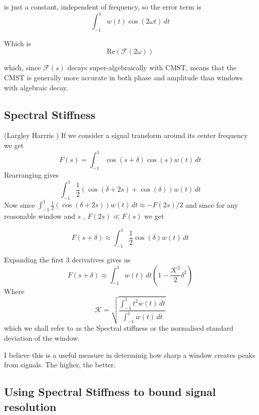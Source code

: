 \documentclass[11pt]{article}
\theoremstyle{breakdef}
\begin{document}
is just a constant, independent of frequency, so the error term is
\begin{equation}
\int_{-1}^{1} w(t) \cos(2 \omega t) \, dt
\end{equation}

Which is 
\begin{equation}
\text{Re}(\mathcal{F}(2\omega))
\end{equation}

which, since $\mathcal{F}(s)$ decays super-algebraically with CMST, means that  the CMST is generally more accurate in both phase and amplitude than  windows with algebraic decay.

\subsection{Spectral Stiffness}
(Largley Harrris \cite{Harris1978})
If we consider a signal transform around its center frequency we get
\begin{equation}
F(s) = \int_{-1}^{1} \cos(s+\delta)\cos(s)w(t) \, dt
\end{equation}
Rearranging gives
\begin{equation}
 \int_{-1}^{1} \frac{1}{2} (\cos (\delta +2 s)+\cos (\delta )) w(t) \, dt
\end{equation}
Now since $ \int_{-1}^{1} \frac{1}{2} (\cos (\delta +2 s)) w(t) \, dt \approx -F(2s)/2 $
and since for any reasonable window and $s$ , $F(2s) \ll F(s)$ we get

\begin{equation}
F(s+\delta) \approx \int_{-1}^1 \frac{1}{2} \cos (\delta ) w(t) \, dt
\end{equation}

Expanding the first 3 derivatives gives us
\begin{equation}
F(s+\delta) \approx \int_{-1}^{1} w(t) \, dt (1  -\frac{\mathcal{K^2}}{2} \delta ^2 )
\end{equation}
Where 
\begin{equation}
\mathcal{K} = \sqrt{\frac{\int_{-1}^{1} t^2 w(t) \, dt}{\int_{-1}^{1} w(t) \, dt}}
\end{equation}
which we shall refer to as the Spectral stiffness or the normalised standard deviation of the window.

I believe this is a useful measure in determinig how sharp a window creates peaks from signals.  The higher, the better.

\subsection{Using Spectral Stiffness to bound signal resolution}
\end{document}
